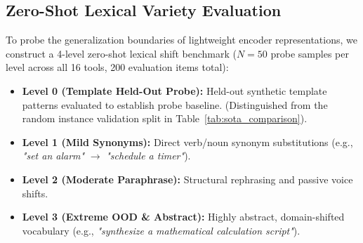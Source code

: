 \documentclass[letterpaper]{article} %
\begin{document}
\begin{table}[t]
\centering
\footnotesize
{}
\caption{Ablation analysis isolating component gains across routing head, sequence tagger, tag schema, trunk freezing, and LoRA adaptation.}
\label{tab:ablation_summary}
\end{table}

\subsection{Zero-Shot Lexical Variety Evaluation}
To probe the generalization boundaries of lightweight encoder representations, we construct a 4-level zero-shot lexical shift benchmark ($N=50$ probe samples per level across all 16 tools, 200 evaluation items total):
\begin{itemize}
    \item \textbf{Level 0 (Template Held-Out Probe):} Held-out synthetic template patterns evaluated to establish probe baseline. (Distinguished from the random instance validation split in Table~\ref{tab:sota_comparison}).
    \item \textbf{Level 1 (Mild Synonyms):} Direct verb/noun synonym substitutions (e.g., \emph{"set an alarm"} $\rightarrow$ \emph{"schedule a timer"}).
    \item \textbf{Level 2 (Moderate Paraphrase):} Structural rephrasing and passive voice shifts.
    \item \textbf{Level 3 (Extreme OOD \& Abstract):} Highly abstract, domain-shifted vocabulary (e.g., \emph{"synthesize a mathematical calculation script"}).
\end{itemize}
\end{document}
